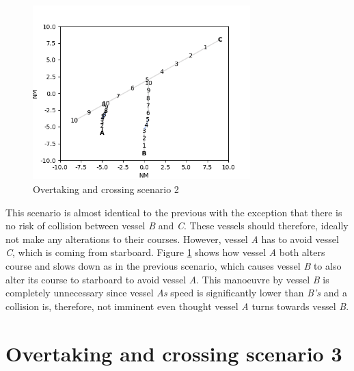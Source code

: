 \begin{figure}[H]
    \centering
    \includegraphics[width=0.75\textwidth,height=0.75\textheight,keepaspectratio]{../src/img/overtaking_crossing_3_res.png}
    \caption{Overtaking and crossing scenario 2}
    \label{fig:overtaking-and-crossing-3-res}
\end{figure}

This scenario is almost identical to the previous with the exception that there is no risk of collision between vessel \textit{B} and \textit{C}. These vessels should therefore, ideally not make any alterations to their courses. However, vessel \textit{A} has to avoid vessel \textit{C}, which is coming from starboard. Figure \ref{fig:overtaking-and-crossing-3-res} shows how vessel \textit{A} both alters course and slows down as in the previous scenario, which causes vessel \textit{B} to also alter its course to starboard to avoid vessel \textit{A}. This manoeuvre by vessel \textit{B} is completely unnecessary since vessel \textit{As} speed is significantly lower than \textit{B's} and a collision is, therefore, not imminent even thought vessel \textit{A} turns towards vessel \textit{B}.

\section{Overtaking and crossing scenario 3}%



